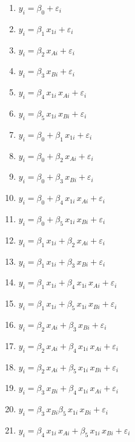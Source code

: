 \documentclass[
  letterpaper,
  DIV=11,
  numbers=noendperiod]{scrartcl}
\begin{document}
\begin{enumerate}
  \item $y_i = \beta_0 + \varepsilon_i$
  \item $y_i = \beta_1 \, x_{1i} + \varepsilon_i$
  \item $y_i = \beta_2 \, x_{Ai} + \varepsilon_i$
  \item $y_i = \beta_3 \, x_{Bi} + \varepsilon_i$
  \item $y_i = \beta_4 \, x_{1i} \, x_{Ai} + \varepsilon_i$
  \item $y_i = \beta_5 \, x_{1i} \, x_{Bi} + \varepsilon_i$
  
 
  \item $y_i = \beta_0 + \beta_1 \, x_{1i} + \varepsilon_i$
  \item $y_i = \beta_0 + \beta_2 \, x_{Ai} + \varepsilon_i$
  \item $y_i = \beta_0 + \beta_3 \, x_{Bi} + \varepsilon_i$
  \item $y_i = \beta_0 + \beta_4 \, x_{1i} \, x_{Ai} + \varepsilon_i$
  \item $y_i = \beta_0 + \beta_5 \, x_{1i} \, x_{Bi} + \varepsilon_i$
  \item $y_i = \beta_1 \, x_{1i} + \beta_2 \, x_{Ai} + \varepsilon_i$
  \item $y_i = \beta_1 \, x_{1i} + \beta_3 \, x_{Bi} + \varepsilon_i$
  \item $y_i = \beta_1 \, x_{1i} + \beta_4 \, x_{1i} \, x_{Ai} + \varepsilon_i$
  \item $y_i =  \beta_1 \, x_{1i} + \beta_5 \, x_{1i} \, x_{Bi} + \varepsilon_i$
  \item $y_i = \beta_2 \, x_{Ai} + \beta_3 \, x_{Bi}+ \varepsilon_i$
  \item $y_i = \beta_2 \, x_{Ai} + \beta_4 \, x_{1i} \, x_{Ai} + \varepsilon_i$
  \item $y_i = \beta_2 \, x_{Ai} + \beta_5 \, x_{1i} \, x_{Bi} + \varepsilon_i$
  \item $y_i = \beta_3 \, x_{Bi} + \beta_4 \, x_{1i} \, x_{Ai} + \varepsilon_i$
  \item $y_i = \beta_3 \, x_{Bi} \beta_5 \, x_{1i} \, x_{Bi} + \varepsilon_i$
  \item $y_i = \beta_4 \, x_{1i} \, x_{Ai} + \beta_5 \, x_{1i} \, x_{Bi} + \varepsilon_i$
  
  


\end{enumerate}
\end{document}
